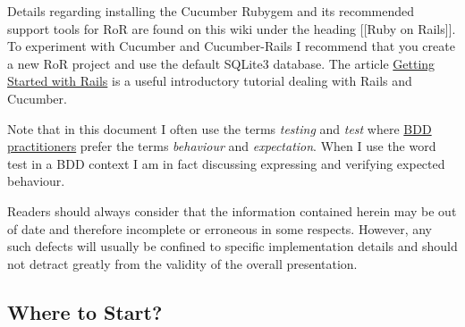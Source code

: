 Details regarding installing the Cucumber Rubygem and its recommended support tools for RoR are found on this wiki under the heading  [[Ruby on Rails]].  To experiment with Cucumber and Cucumber-Rails I recommend that you create a new RoR project and use the default SQLite3 database.  The article \href{http://www.ultrasaurus.com/code/2008/12/getting-started-with-rails.html}{Getting Started with Rails} is a useful introductory tutorial dealing with Rails and Cucumber.

Note that in this document I often use the terms \emph{testing} and \emph{test} where \href{http://dannorth.net/introducing-bdd}{BDD practitioners} prefer the terms \emph{behaviour} and \emph{expectation}.  When I use the word test in a BDD context I am in fact discussing expressing and verifying expected behaviour.

Readers should always consider that the information contained herein may be out of date and therefore incomplete or erroneous in some respects.  However, any such defects will usually be confined to specific implementation details and should not detract greatly from the validity of the overall presentation.

\subsection{Where to Start?}


